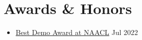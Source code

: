 
\section{\sc Awards \& Honors}

\begin{itemize}
    \item \href{https://2022.naacl.org/blog/best-demo-award/}{Best Demo Award at NAACL} \hfill Jul 2022
\end{itemize}
